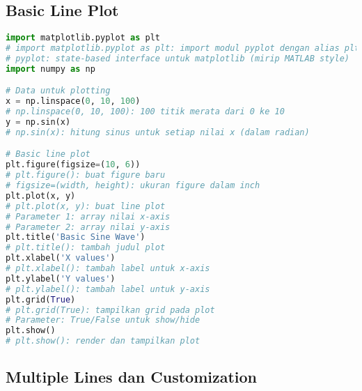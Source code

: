 \subsection*{Basic Line Plot}

\begin{lstlisting}[language=python, caption={Membuat Line Plot Dasar}, style=python]
import matplotlib.pyplot as plt
# import matplotlib.pyplot as plt: import modul pyplot dengan alias plt
# pyplot: state-based interface untuk matplotlib (mirip MATLAB style)
import numpy as np

# Data untuk plotting
x = np.linspace(0, 10, 100)
# np.linspace(0, 10, 100): 100 titik merata dari 0 ke 10
y = np.sin(x)
# np.sin(x): hitung sinus untuk setiap nilai x (dalam radian)

# Basic line plot
plt.figure(figsize=(10, 6))
# plt.figure(): buat figure baru
# figsize=(width, height): ukuran figure dalam inch
plt.plot(x, y)
# plt.plot(x, y): buat line plot
# Parameter 1: array nilai x-axis
# Parameter 2: array nilai y-axis
plt.title('Basic Sine Wave')
# plt.title(): tambah judul plot
plt.xlabel('X values')
# plt.xlabel(): tambah label untuk x-axis
plt.ylabel('Y values')
# plt.ylabel(): tambah label untuk y-axis
plt.grid(True)
# plt.grid(True): tampilkan grid pada plot
# Parameter: True/False untuk show/hide
plt.show()
# plt.show(): render dan tampilkan plot
\end{lstlisting}

\subsection*{Multiple Lines dan Customization}


